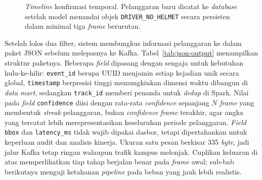 \begin{figure}[htbp]
\centering
{}
\caption{\textit{Timeline} konfirmasi temporal. Pelanggaran baru dicatat ke \textit{database} setelah model menandai objek \texttt{DRIVER\_NO\_HELMET} secara persisten dalam minimal tiga \textit{frame} berurutan.}
\label{fig:streak-timeline}
\end{figure}

Setelah lolos dua filter, sistem membungkus informasi pelanggaran ke dalam paket JSON sebelum melepasnya ke Kafka. Tabel~\ref{tab:json-output} menampilkan struktur paketnya. Beberapa \textit{field} dipasang dengan sengaja untuk kebutuhan hulu-ke-hilir: \texttt{event\_id} berupa UUID menjamin setiap kejadian unik secara global, \texttt{timestamp} berpresisi tinggi memungkinkan dimensi waktu dibangun di \textit{data mart}, sedangkan \texttt{track\_id} memberi penanda untuk \textit{dedup} di Spark. Nilai pada \textit{field} \texttt{confidence} diisi dengan rata-rata \textit{confidence} sepanjang $N$ \textit{frame} yang membentuk \textit{streak} pelanggaran, bukan \textit{confidence} \textit{frame} terakhir, agar angka yang tercatat lebih merepresentasikan keseluruhan periode pelanggaran. \textit{Field} \texttt{bbox} dan \texttt{latency\_ms} tidak wajib dipakai dasbor, tetapi dipertahankan untuk keperluan audit dan analisis kinerja. Ukuran satu pesan berkisar 335 \textit{byte}, jadi jalur Kafka tetap ringan walaupun trafik kampus melonjak. Cuplikan keluaran di atas memperlihatkan tiap tahap berjalan benar pada \textit{frame} awal; sub-bab berikutnya menguji ketahanan \textit{pipeline} pada beban yang jauh lebih realistis.

